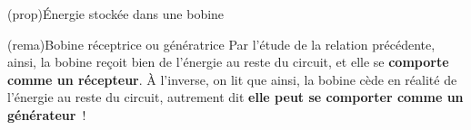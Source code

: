 \documentclass[../../main/main.tex]{subfiles}
\begin{document}
\begin{tcb*}[label=prop:El](prop){Énergie stockée dans une bobine}
	\psw{%
		\[
			\boxed{\Ec_L(t) = \frac{1}{2}L i{}^2(t)}
		\]
	}%
	\vspace{-10pt}
\end{tcb*}
\begin{tcb*}[label=rema:genrec, sidebyside](rema){Bobine réceptrice ou
			génératrice}
	Par l'étude de la relation précédente,
	ainsi, la bobine reçoit bien de l'énergie au reste du circuit, et elle se
	\textbf{comporte comme un récepteur}.
	\tcblower
	À l'inverse, on lit que
	ainsi, la bobine cède en réalité de l'énergie au reste du circuit,
	autrement dit \textbf{elle peut se comporter comme un générateur}~!
\end{tcb*}
\end{document}
